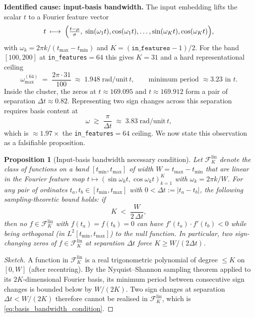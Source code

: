 \documentclass[11pt, a4paper]{article}
\theoremstyle{definition}
\theoremstyle{plain}
\newtheorem{proposition}[theorem]{Proposition}
\begin{document}
\smallskip
\noindent\textbf{Identified cause: input-basis bandwidth.} The
input embedding lifts the scalar $t$ to a Fourier feature
vector
\[
  t\;\longmapsto\;\Bigl(\tfrac{t-\mu}{\sigma},\;
  \sin(\omega_1 t),\cos(\omega_1 t),\dots,
  \sin(\omega_K t),\cos(\omega_K t)\Bigr),
\]
with
$\omega_k = 2\pi k/(t_{\max}-t_{\min})$ and
$K=(\texttt{in\_features}-1)/2$. For the band $[100,200]$ at
\texttt{in\_features}$=64$ this gives $K=31$ and a hard
representational ceiling
\[
  \omega_{\max}^{(64)}
  \;=\; \frac{2\pi\cdot 31}{100}\;\approx\; 1.948\;
  \mathrm{rad}/\mathrm{unit}\,t,
  \qquad \text{minimum period }\approx 3.23\text{ in }t.
\]
Inside the cluster, the zeros at $t\approx 169.095$ and
$t\approx 169.912$ form a pair of separation
$\Delta t\approx 0.82$. Representing two sign changes across
this separation requires basis content at
\begin{equation}
  \omega\;\gtrsim\; \frac{\pi}{\Delta t}\;\approx\; 3.83\;
  \mathrm{rad}/\mathrm{unit}\,t,
  \label{eq:required_omega}
\end{equation}
which is $\approx 1.97\times$ the
\texttt{in\_features}$=64$ ceiling. We now state this
observation as a falsifiable proposition.

\begin{proposition}[Input-basis bandwidth necessary condition]
\label{prop:basis_bandwidth}
Let $\mathcal{F}_K^{\mathrm{lin}}$ denote the class of
functions on a band $[t_{\min},t_{\max}]$ of width
$W=t_{\max}-t_{\min}$ that are \emph{linear} in the Fourier
feature map
$t\mapsto(\sin\omega_k t,\cos\omega_k t)_{k=1}^{K}$ with
$\omega_k=2\pi k/W$. For any pair of ordinates
$t_a,t_b\in[t_{\min},t_{\max}]$ with $0<\Delta t:=|t_a-t_b|$,
the following sampling-theoretic bound holds: if
\begin{equation}
  K \;<\; \frac{W}{2\,\Delta t},
  \label{eq:basis_bandwidth_condition}
\end{equation}
then no $f\in\mathcal{F}_K^{\mathrm{lin}}$ with
$f(t_a)=f(t_b)=0$ can have $f'(t_a)\cdot f'(t_b)<0$ while
being orthogonal (in $L^2[t_{\min},t_{\max}]$) to the null
function. In particular, two sign-changing zeros of
$f\in\mathcal{F}_K^{\mathrm{lin}}$ at separation $\Delta t$
force $K\geq W/(2\Delta t)$.
\end{proposition}

\begin{proof}[Sketch]
A function in $\mathcal{F}_K^{\mathrm{lin}}$ is a real
trigonometric polynomial of degree $\leq K$ on $[0,W]$ (after
recentring). By the Nyquist--Shannon sampling theorem applied
to its $2K$-dimensional Fourier basis, its minimum period
between consecutive sign changes is bounded below by
$W/(2K)$. Two sign changes at separation $\Delta t<W/(2K)$
therefore cannot be realised in $\mathcal{F}_K^{\mathrm{lin}}$,
which is \eqref{eq:basis_bandwidth_condition}.
\end{proof}
\end{document}
